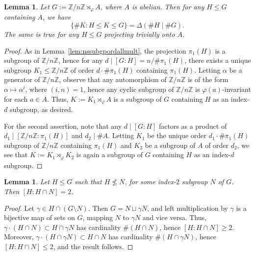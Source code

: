 \documentclass[table,dvipsnames]{amsart}
\newcommand{\Z}{\mathbb{Z}}
\newtheorem{lemma}[theorem]{Lemma}
\numberwithin{equation}{section}
\begin{document}
\begin{lemma}
\label{lem:nnssubgpordallmult}
Let $G:=\Z/n\Z\rtimes_\varphi A$, where $A$ is abelian. Then for any $H\le G$ containing $A$, we have
\begin{equation*}
\{\#K:H\le K\le G\}=\Delta(\#H\mid\#G).
\end{equation*}
The same is true for any $H\le G$ projecting trivially onto $A$. 
\end{lemma}
\begin{proof}
As in Lemma~\ref{lem:nssubgpordallmult}, the projection $\pi_1(H)$ is a subgroup of $\Z/n\Z$, hence for any $d\mid [G:H]=n/\#\pi_1(H)$, there exists a unique subgroup $K_1\le\Z/n\Z$ of order $d\cdot\#\pi_1(H)$ containing $\pi_1(H)$. Letting $\alpha$ be a generator of $\Z/n\Z$, observe that any automorphism of $\Z/n\Z$ is of the form $\alpha\mapsto\alpha^i$, where $(i,n)=1$, hence any cyclic subgroup of $\Z/n\Z$ is $\varphi(a)$-invariant for each $a\in A$. Thus, $K:=K_1\rtimes_\varphi A$ is a subgroup of $G$ containing $H$ as an index-$d$ subgroup, as desired.

For the second assertion, note that any $d\mid [G:H]$ factors as a product of $d_1\mid [\Z/n\Z:\pi_1(H)]$ and $d_2\mid\# A$. Letting $K_1$ be the unique order $d_1\cdot\#\pi_1(H)$ subgroup of $\Z/n\Z$ containing $\pi_1(H)$ and $K_2$ be a subgroup of $A$ of order $d_2$, we see that $K:=K_1\rtimes_\varphi K_2$ is again a subgroup of $G$ containing $H$ as an index-$d$ subgroup.
\end{proof}

\begin{lemma}
\label{lem:index2subgpint}
Let $H\le G$ such that $H\not\le N$, for some index-$2$ subgroup $N$ of $G$. Then $[H:H\cap N]=2$.
\end{lemma}
\begin{proof}
Let $\gamma\in H\cap(G\setminus N)$. Then $G=N\sqcup\gamma N$, and left multiplication by $\gamma$ is a bijective map of sets on $G$, mapping $N$ to $\gamma N$ and vice versa. Thus, $\gamma\cdot(H\cap N)\subset H\cap\gamma N$ has cardinality $\#(H\cap N)$, hence $[H:H\cap N]\ge 2$. Moreover, $\gamma\cdot(H\cap\gamma N)\subset H\cap N$ has cardinality $\#(H\cap\gamma N)$, hence $[H:H\cap N]\le 2$, and the result follows.
\end{proof}
\end{document}
